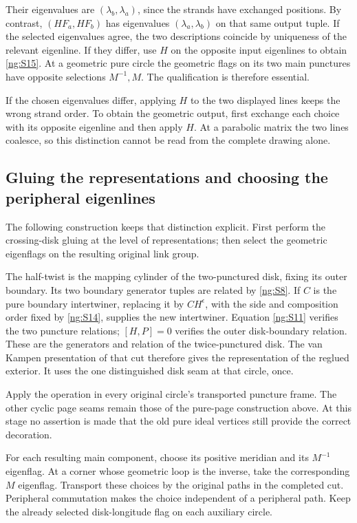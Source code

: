Their eigenvalues are \((\lambda_b,\lambda_a)\), since
the strands have exchanged positions. By contrast,
\((HF_a,HF_b)\) has eigenvalues
\((\lambda_a,\lambda_b)\) on that same output tuple.
If the selected eigenvalues agree, the two descriptions coincide
by uniqueness of the relevant eigenline. If they differ, use
\(H\) on the opposite input eigenlines to obtain \eqref{ng:S15}.
At a geometric pure circle the geometric flags on its two main
punctures have opposite selections \(M^{-1},M\).
The qualification is therefore essential.

If the chosen eigenvalues differ, applying \(H\) to the two
displayed lines keeps the wrong strand order. To obtain the geometric
output, first exchange each choice with its opposite eigenline and
then apply \(H\). At a parabolic matrix the two lines coalesce,
so this distinction cannot be read from the complete drawing alone.

\subsection{Gluing the representations and choosing the peripheral eigenlines}\label{ng:representation-gluing-followed-by-global-decoration}

The following construction keeps that distinction explicit.
First perform the crossing-disk gluing at the level of
representations; then select the geometric eigenflags on the
resulting original link group.

The half-twist is the mapping cylinder of the two-punctured
disk, fixing its outer boundary. Its two boundary generator
tuples are related by \eqref{ng:S8}. If \(C\) is the pure boundary
intertwiner, replacing it by \(CH^\epsilon\), with the side
and composition order fixed by \eqref{ng:S14}, supplies the new
intertwiner. Equation \eqref{ng:S11} verifies the two puncture relations;
\([H,P]=0\) verifies the outer disk-boundary relation. These
are the generators and relation of the twice-punctured disk.
The van Kampen presentation of that cut therefore gives
the representation of the reglued exterior. It uses the one
distinguished disk seam at that circle, once.

Apply the operation in every original circle's transported
puncture frame. The other cyclic page seams remain those of
the pure-page construction above. At this stage no assertion is made that the old
pure ideal vertices still provide the correct decoration.

For each resulting main component, choose its positive
meridian and its \(M^{-1}\) eigenflag. At a corner whose
geometric loop is the inverse, take the corresponding \(M\)
eigenflag. Transport these choices by the original paths in the
completed cut. Peripheral commutation makes the choice independent
of a peripheral path. Keep the already selected disk-longitude
flag on each auxiliary circle.

